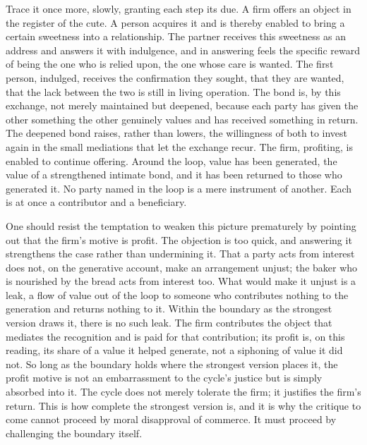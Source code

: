 \documentclass[11pt,a4paper]{article}
\begin{document}
Trace it once more, slowly, granting each step its due. A firm offers an object in the register of the cute. A person acquires it and is thereby enabled to bring a certain sweetness into a relationship. The partner receives this sweetness as an address and answers it with indulgence, and in answering feels the specific reward of being the one who is relied upon, the one whose care is wanted. The first person, indulged, receives the confirmation they sought, that they are wanted, that the lack between the two is still in living operation. The bond is, by this exchange, not merely maintained but deepened, because each party has given the other something the other genuinely values and has received something in return. The deepened bond raises, rather than lowers, the willingness of both to invest again in the small mediations that let the exchange recur. The firm, profiting, is enabled to continue offering. Around the loop, value has been generated, the value of a strengthened intimate bond, and it has been returned to those who generated it. No party named in the loop is a mere instrument of another. Each is at once a contributor and a beneficiary.

One should resist the temptation to weaken this picture prematurely by pointing out that the firm's motive is profit. The objection is too quick, and answering it strengthens the case rather than undermining it. That a party acts from interest does not, on the generative account, make an arrangement unjust; the baker who is nourished by the bread acts from interest too. What would make it unjust is a leak, a flow of value out of the loop to someone who contributes nothing to the generation and returns nothing to it. Within the boundary as the strongest version draws it, there is no such leak. The firm contributes the object that mediates the recognition and is paid for that contribution; its profit is, on this reading, its share of a value it helped generate, not a siphoning of value it did not. So long as the boundary holds where the strongest version places it, the profit motive is not an embarrassment to the cycle's justice but is simply absorbed into it. The cycle does not merely tolerate the firm; it justifies the firm's return. This is how complete the strongest version is, and it is why the critique to come cannot proceed by moral disapproval of commerce. It must proceed by challenging the boundary itself.
\end{document}
